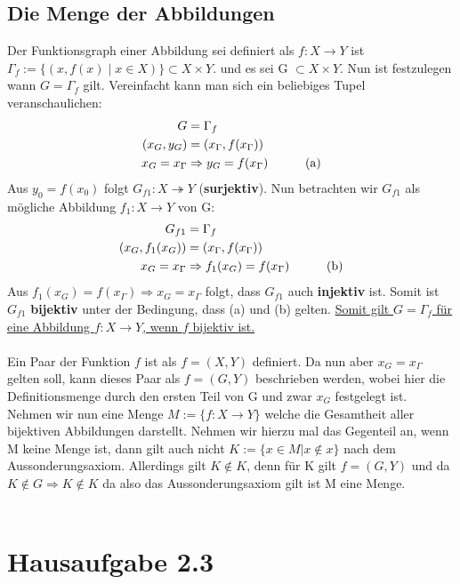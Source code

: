 \documentclass[titlepage]{article}
\begin{document}
		\subsection*{Die Menge der Abbildungen}
			Der Funktionsgraph einer Abbildung sei definiert als $f: X\rightarrow Y$ ist $\Gamma_f:=\{(x,f(x)\mid x\in X)\}\subset X\times Y$. und es sei G $\subset X\times Y$. Nun ist festzulegen wann $G=\Gamma_f$ gilt. Vereinfacht kann man sich ein beliebiges Tupel veranschaulichen: 
			\begin{align*}
				G &= \Gamma_f\\
				(x_G,y_G) &= (x_\Gamma,f(x_\Gamma)) \\
				 x_G=x_\Gamma &\Rightarrow y_G=f(x_\Gamma) \text{\quad\quad\quad (a)}
			\end{align*}
			Aus $y_0=f(x_0)$ folgt $G_{f1}:X\twoheadrightarrow Y$ (\textbf{surjektiv}). Nun betrachten wir $G_{f1}$ als mögliche Abbildung $f_1:X\rightarrow Y$ von G:
			\begin{align*}
				G_{f1} &= \Gamma_f\\
				(x_G,f_1(x_G)) &= (x_\Gamma,f(x_\Gamma))\\
				x_G = x_\Gamma &\Rightarrow f_1(x_G)=f(x_\Gamma) \text{\quad\quad\quad (b)}
			\end{align*}
			\noindent
			Aus $f_1(x_G)=f(x_\Gamma) \Rightarrow x_G = x_\Gamma$ folgt, dass $G_{f1}$ auch \textbf{injektiv} ist. Somit ist $G_{f1}$ \textbf{bijektiv} unter der Bedingung, dass (a) und (b) gelten. \underline{Somit gilt $G=\Gamma_f$ für eine Abbildung $f:X\rightarrow Y$, wenn $f$ bijektiv ist.} \\\\
			
			\noindent
			Ein Paar der Funktion $f$ ist als $f=(X,Y)$ definiert. Da nun aber $x_G=x_\Gamma$ gelten soll, kann dieses Paar als $f=(G,Y)$ beschrieben werden, wobei hier die Definitionsmenge durch den ersten Teil von G und zwar $x_G$ festgelegt ist. Nehmen wir nun eine Menge $M:=\{f: X\rightarrow Y\}$ welche die Gesamtheit aller bijektiven Abbildungen darstellt. Nehmen wir hierzu mal das Gegenteil an, wenn M keine Menge ist, dann gilt auch nicht  $K := \{x \in M |x \not\in x\}$ nach dem Aussonderungsaxiom. Allerdings gilt $K\not\in K$, denn für K gilt $f=(G,Y)$ und da $K\not\in G\Rightarrow K\not\in K$ da also das Aussonderungsaxiom gilt ist M eine Menge. 
			\\\\
			
	\section*{Hausaufgabe 2.3}
\end{document}
